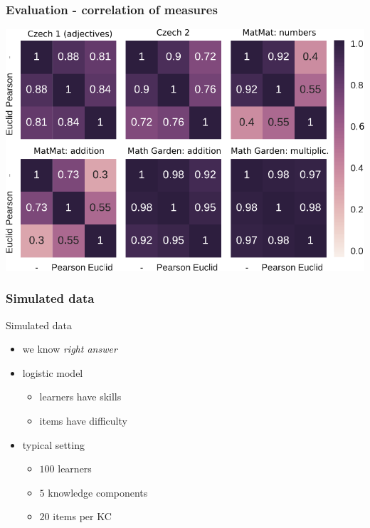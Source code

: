 \documentclass[xcolor=svgnames]{beamer}
\begin{document}
\begin{frame}
    \frametitle{Evaluation - correlation of measures}
    \includegraphics[width=\linewidth]{figures/measures-correlations2}
\end{frame}
\begin{frame}
    \frametitle{Simulated data}
    \Large
    Simulated data
    \begin{itemize}
        \item we know \emph{right answer}
        \item logistic model
        \begin{itemize}
            \large
            \item learners have skills
            \item items have difficulty
        \end{itemize}
        \item typical setting
        \begin{itemize}
            \large
            \item $100$ learners
            \item $5$ knowledge components
            \item $20$ items per KC
        \end{itemize}
    \end{itemize}
\end{frame}
\end{document}
